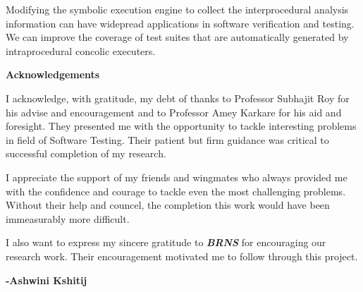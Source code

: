 \documentclass[12pt,oneside]{book}
\begin{document}
\vspace {0.5 cm}

Modifying the symbolic execution engine to collect the interprocedural analysis information can have widepread applications in software verification and testing. We can improve the coverage of test suites that are automatically generated by intraprocedural concolic executers.   

  






\newpage

\begin{center}
\textbf{\Large{Acknowledgements}}
\end{center}

\vspace{1.0 cm}

I acknowledge, with gratitude, my debt of thanks to Professor Subhajit Roy for his advise and encouragement and to Professor Amey Karkare for his aid and foresight. They presented me with the opportunity to tackle interesting problems in field of Software Testing. Their patient but firm guidance was critical to successful completion of my research.  

\vspace{0.5 cm}

I appreciate the support of my friends and wingmates who always provided me with the confidence and courage to tackle even the most challenging problems. Without their help and councel, the completion this work would have been immeasurably more difficult. 

\vspace{1.0 cm}

I also want to express my sincere gratitude to \textit {\textbf {BRNS}} for encouraging our research work. Their encouragement motivated me to follow through this project.

\begin{flushright}
\textbf{-Ashwini Kshitij}
\end{flushright}

\newpage


\tableofcontents
\listoffigures
\listoftables


\mainmatter

\end{document}
